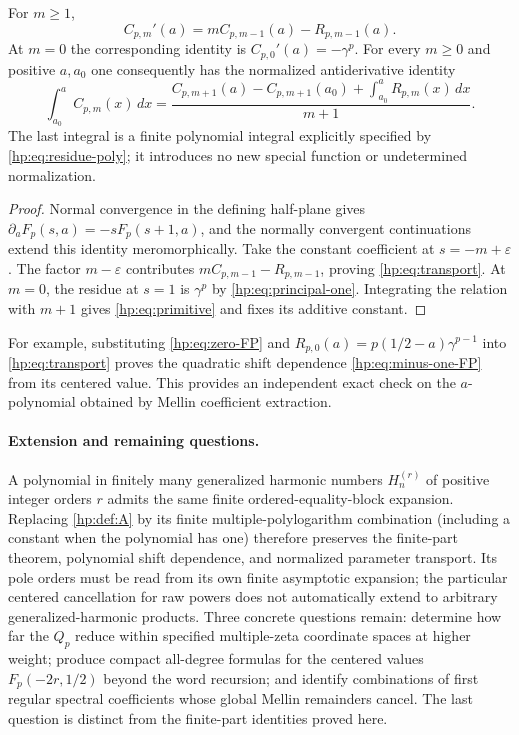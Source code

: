 \begin{theorem}
\label{hp:thm:transport}
For $m\ge1$,
\begin{equation}\label{hp:eq:transport}
 C_{p,m}'(a)=mC_{p,m-1}(a)-R_{p,m-1}(a).
\end{equation}
At $m=0$ the corresponding identity is $C_{p,0}'(a)=-\gamma^p$.
For every $m\ge0$ and positive $a,a_0$ one consequently has the
normalized antiderivative identity
\begin{equation}\label{hp:eq:primitive}
 \boxed{\quad
 \int_{a_0}^a C_{p,m}(x)\,dx=
 \frac{C_{p,m+1}(a)-C_{p,m+1}(a_0)
              +\int_{a_0}^aR_{p,m}(x)\,dx}{m+1}.\quad}
\end{equation}
The last integral is a finite polynomial integral explicitly specified
by \eqref{hp:eq:residue-poly}; it introduces no new special function
or undetermined normalization.
\end{theorem}
\begin{proof}
Normal convergence in the defining half-plane gives
$\partial_aF_p(s,a)=-sF_p(s+1,a)$, and the normally convergent
continuations extend this identity meromorphically. Take the constant
coefficient at $s=-m+\varepsilon$.
The factor $m-\varepsilon$ contributes
$mC_{p,m-1}-R_{p,m-1}$, proving \eqref{hp:eq:transport}.
At $m=0$, the residue at $s=1$ is $\gamma^p$ by
\eqref{hp:eq:principal-one}. Integrating the relation with $m+1$
gives \eqref{hp:eq:primitive} and fixes its additive constant.
\end{proof}

For example, substituting \eqref{hp:eq:zero-FP} and
$R_{p,0}(a)=p(1/2-a)\gamma^{p-1}$ into
\eqref{hp:eq:transport} proves the quadratic shift dependence
\eqref{hp:eq:minus-one-FP} from its centered value. This provides an
independent exact check on the $a$-polynomial obtained by Mellin
coefficient extraction.

\paragraph{Extension and remaining questions.}
A polynomial in finitely many generalized harmonic numbers
$H_n^{(r)}$ of positive integer orders $r$ admits the same finite
ordered-equality-block expansion.
Replacing \eqref{hp:def:A} by its finite multiple-polylogarithm
combination (including a constant when the polynomial has one)
therefore preserves the finite-part theorem, polynomial
shift dependence, and normalized parameter transport. Its pole orders
must be read from its own finite asymptotic expansion; the particular
centered cancellation for raw powers does not automatically extend to
arbitrary generalized-harmonic products.
Three concrete questions remain: determine how far the $Q_p$ reduce
within specified multiple-zeta coordinate spaces at higher weight;
produce compact all-degree formulas for the centered values
$F_p(-2r,1/2)$ beyond the word recursion; and identify combinations of
first regular spectral coefficients whose global Mellin remainders
cancel. The last question is distinct from the finite-part identities
proved here.
